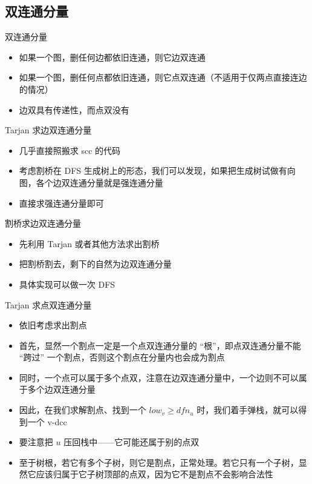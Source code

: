 ﻿\documentclass[aspectratio=169]{ctexbeamer}
\begin{document}
\subsection{双连通分量}
\begin{frame}{双连通分量}
    \begin{itemize}
        \item 如果一个图，删任何边都依旧连通，则它边双连通
        \item 如果一个图，删任何点都依旧连通，则它点双连通（不适用于仅两点直接连边的情况）
        \item 边双具有传递性，而点双没有
    \end{itemize}
\end{frame}

\begin{frame}{Tarjan 求边双连通分量}
    \begin{itemize}
        \item 几乎直接照搬求 scc 的代码
        \item 考虑割桥在 DFS 生成树上的形态，我们可以发现，如果把生成树试做有向图，各个边双连通分量就是强连通分量
        \item 直接求强连通分量即可
    \end{itemize}
\end{frame}

\begin{frame}{割桥求边双连通分量}
    \begin{itemize}
        \item 先利用 Tarjan 或者其他方法求出割桥
        \item 把割桥割去，剩下的自然为边双连通分量
        \item 具体实现可以做一次 DFS
    \end{itemize}
\end{frame}

\begin{frame}{Tarjan 求点双连通分量}
    \begin{itemize}
        \item 依旧考虑求出割点
        \item 首先，显然一个割点一定是一个点双连通分量的 “根”，即点双连通分量不能 “跨过” 一个割点，否则这个割点在分量内也会成为割点
        \item 同时，一个点可以属于多个点双，注意在边双连通分量中，一个边则不可以属于多个边双连通分量
        \item 因此，在我们求解割点、找到一个 $low_v\ge dfn_u$ 时，我们着手弹栈，就可以得到一个 v-dcc
        \item 要注意把 $u$ 压回栈中——它可能还属于别的点双
        \item 至于树根，若它有多个子树，则它是割点，正常处理。若它只有一个子树，显然它应该归属于它子树顶部的点双，因为它不是割点不会影响合法性
    \end{itemize}
\end{frame}
\end{document}
